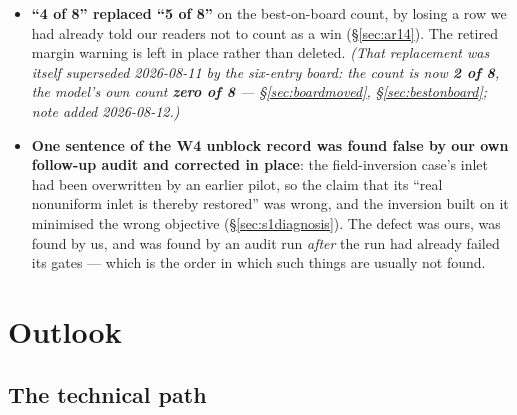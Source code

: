 \documentclass[11pt,a4paper]{article}
\begin{document}
\begin{itemize}
{  2026-08-07}, not softened. It became false of three of our eight predictions the moment
  round 5 shipped, and the self-description at the front of \S\ref{sec:method} now leads
  with that rather than qualifying it in a footnote.
\item \textbf{``4 of 8'' replaced ``5 of 8''} on the best-on-board count, by losing a row
  we had already told our readers not to count as a win (\S\ref{sec:ar14}). The retired
  margin warning is left in place rather than deleted. \emph{(That replacement was itself
  superseded 2026-08-11 by the six-entry board: the count is now \textbf{2 of 8}, the
  model's own count \textbf{zero of 8} --- \S\ref{sec:boardmoved},
  \S\ref{sec:bestonboard}; note added 2026-08-12.)}
\item \textbf{One sentence of the W4 unblock record was found false by our own follow-up
  audit and corrected in place}: the field-inversion case's inlet had been overwritten by
  an earlier pilot, so the claim that its ``real nonuniform inlet is thereby restored''
  was wrong, and the inversion built on it minimised the wrong objective
  (\S\ref{sec:s1diagnosis}). The defect was ours, was found by us, and was found by an
  audit run \emph{after} the run had already failed its gates --- which is the order in
  which such things are usually not found.
\end{itemize}

\section{Outlook}

\subsection{The technical path}
\end{document}
